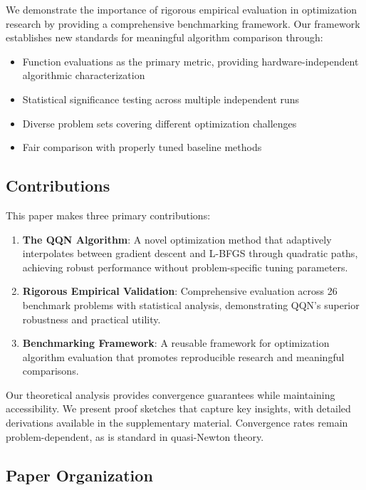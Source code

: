We demonstrate the importance of rigorous empirical evaluation in optimization research by providing a comprehensive benchmarking framework. Our framework establishes new standards for meaningful algorithm comparison through:

\begin{itemize}
\tightlist
\item
  Function evaluations as the primary metric, providing hardware-independent algorithmic characterization
\item
  Statistical significance testing across multiple independent runs
\item
  Diverse problem sets covering different optimization challenges
\item
  Fair comparison with properly tuned baseline methods
\end{itemize}

\hypertarget{contributions}{%
\subsection{Contributions}\label{contributions}}

This paper makes three primary contributions:

\begin{enumerate}
\def\labelenumi{\arabic{enumi}.}
\item
  \textbf{The QQN Algorithm}: A novel optimization method that adaptively interpolates between gradient descent and L-BFGS through quadratic paths, achieving robust performance without problem-specific tuning parameters.
\item
  \textbf{Rigorous Empirical Validation}: Comprehensive evaluation across 26 benchmark problems with statistical analysis, demonstrating QQN's superior robustness and practical utility.
\item
  \textbf{Benchmarking Framework}: A reusable framework for optimization algorithm evaluation that promotes reproducible research and meaningful comparisons.
\end{enumerate}

Our theoretical analysis provides convergence guarantees while maintaining accessibility.
We present proof sketches that capture key insights, with detailed derivations available in the supplementary material.
Convergence rates remain problem-dependent, as is standard in quasi-Newton theory.

\hypertarget{paper-organization}{%
\subsection{Paper Organization}\label{paper-organization}}

